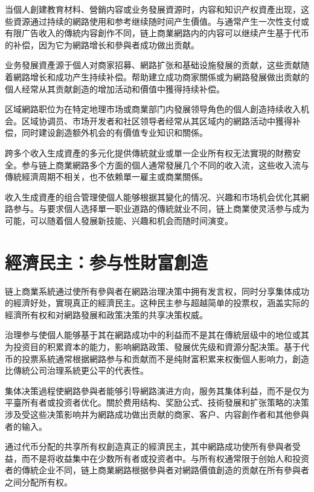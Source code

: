 \documentclass[
  Letterpaper,
]{scrbook}
\begin{document}
当個人創建教育材料、營銷内容或业务發展資源时，内容和知识产权資產出现，这些資源通过持续的網路使用和参考继续随时间产生價值。与通常产生一次性支付或有限广告收入的傳統内容創作不同，链上商業網路内的内容可以继续产生基于代币的补偿，因为它为網路增长和參與者成功做出贡献。

业务發展資產源于個人对商家招募、網路扩张和基础设施發展的贡献，这些贡献随着網路增长和成功产生持续补偿。帮助建立成功商家關係或为網路發展做出贡献的個人经常从其贡献創造的增加活动和價值中獲得持续补偿。

区域網路职位为在特定地理市场或商業部门内發展领导角色的個人創造持续收入机会。区域协调员、市场开发者和社区领导者经常从其区域内的網路活动中獲得补偿，同时建设創造额外机会的有價值专业知识和關係。

跨多个收入生成資產的多元化提供傳統就业或單一企业所有权无法實現的財務安全。参与链上商業網路多个方面的個人通常發展几个不同的收入流，这些收入流与傳統經濟周期不相关，也不依赖單一雇主或商業關係。

收入生成資產的组合管理使個人能够根据其變化的情况、兴趣和市场机会优化其網路参与。与要求個人选择單一职业道路的傳統就业不同，链上商業使灵活参与成为可能，可以随着個人發展新技能、兴趣和机会而随时间演变。

\section{經濟民主：参与性財富創造}\label{ux7d93ux6fdfux6c11ux4e3bux53c2ux4e0eux6027ux8ca1ux5bccux5275ux9020}

链上商業系統通过使所有參與者在網路治理决策中拥有发言权，同时分享集体成功的經濟好处，實現真正的經濟民主。这种民主参与超越简单的投票权，涵盖实际的經濟所有权和对網路發展和政策决策的共享决策权威。

治理参与使個人能够基于其在網路成功中的利益而不是其在傳統层级中的地位或其为投资目的积累資本的能力，影响網路政策、發展优先级和資源分配决策。基于代币的投票系統通常根据網路参与和贡献而不是纯財富积累来权衡個人影响力，創造比傳統公司治理系統更公平的代表性。

集体决策過程使網路參與者能够引导網路演进方向，服务其集体利益，而不是仅为平臺所有者或投资者优化。關於费用结构、奖励公式、技術發展和扩张策略的决策涉及受这些决策影响并为網路成功做出贡献的商家、客户、内容創作者和其他參與者的输入。

通过代币分配的共享所有权創造真正的經濟民主，其中網路成功使所有參與者受益，而不是将收益集中在少数所有者或投资者中。与所有权通常限于创始人和投资者的傳統企业不同，链上商業網路根据參與者对網路價值創造的贡献在所有參與者之间分配所有权。
\end{document}
